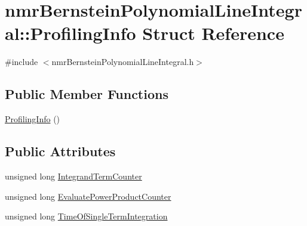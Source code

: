 \hypertarget{structnmr_bernstein_polynomial_line_integral_1_1_profiling_info}{\section{nmr\-Bernstein\-Polynomial\-Line\-Integral\-:\-:Profiling\-Info Struct Reference}
\label{structnmr_bernstein_polynomial_line_integral_1_1_profiling_info}
}


{\ttfamily \#include $<$nmr\-Bernstein\-Polynomial\-Line\-Integral.\-h$>$}

\subsection*{Public Member Functions}
\begin{DoxyCompactItemize}
\item 
\hyperlink{structnmr_bernstein_polynomial_line_integral_1_1_profiling_info_ab4fd7355e43e55ab12c3f5d53a113364}{Profiling\-Info} ()
\end{DoxyCompactItemize}
\subsection*{Public Attributes}
\begin{DoxyCompactItemize}
\item 
unsigned long \hyperlink{structnmr_bernstein_polynomial_line_integral_1_1_profiling_info_a394ec4b165591d1d81baffe5a7de562f}{Integrand\-Term\-Counter}
\item 
unsigned long \hyperlink{structnmr_bernstein_polynomial_line_integral_1_1_profiling_info_ae3c1d0a4469dfffa0fd47b2c71582dd9}{Evaluate\-Power\-Product\-Counter}
\item 
unsigned long \hyperlink{structnmr_bernstein_polynomial_line_integral_1_1_profiling_info_a6aabda6c9c68e2e233a7445c1ef49557}{Time\-Of\-Single\-Term\-Integration}
\end{DoxyCompactItemize}


